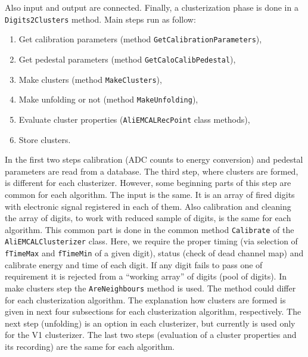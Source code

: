 %
Also input and output are connected. Finally, a clusterization phase is done in a \texttt{Digits2Clusters} method. Main steps run as follow:
\begin{enumerate}
\item Get calibration parameters (method \texttt{GetCalibrationParameters}),
\item Get pedestal parameters (method \texttt{GetCaloCalibPedestal}),
\item Make clusters (method \texttt{MakeClusters}),
\item Make unfolding or not (method \texttt{MakeUnfolding}),
\item Evaluate cluster properties (\texttt{AliEMCALRecPoint} class methods),
\item Store clusters.
\end{enumerate}
In the first two steps calibration (ADC counts to energy conversion) and pedestal parameters are read from a database. The third step, where clusters are formed, is different for each clusterizer. 
However, some beginning parts of this step are common for each algorithm. The input is the same. It is an array of fired digits with electronic signal registered in each of them. Also calibration and cleaning the array of digits, to work with reduced sample of digits, is the same for each algorithm. This common part is done in the common method \texttt{Calibrate} of the \texttt{AliEMCALClusterizer} class. Here, we require the proper timing (via selection of \texttt{fTimeMax} and \texttt{fTimeMin} of a given digit), status (check of dead channel map) and calibrate energy and time of each digit. If any digit fails to pass one of requirement it is rejected from a ``working array'' of digits (pool of digits). In make clusters step the \texttt{AreNeighbours} method is used. The method could differ for each clusterization algorithm. 
The explanation how clusters are formed is given in next four subsections for each clusterization algorithm, respectively. The next step (unfolding) is an option in each clusterizer, but currently is used only for the V1 clusterizer. The last two steps (evaluation of a cluster properties and its recording) are the same for each algorithm.


